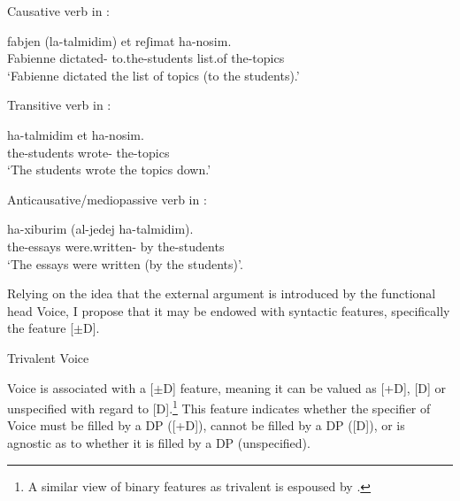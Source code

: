 \begin{exe}
\begin{xlist}
\begin{exe}
\begin{exe}
\begin{exe}
\begin{exe}
\begin{xlist}
\begin{exe}
\begin{xlist}
\begin{xlist}
\begin{xlist}
\begin{exe}
\begin{xlist}
\begin{exe}
\begin{exe}
\begin{xlist}
\begin{exe}
\begin{xlist}
\begin{exe}
\begin{exe}
\begin{xlist}
\begin{exe}
\begin{xlist}
\begin{exe}
\begin{xlist}
\begin{exe}
\begin{exe}
\begin{xlist}
\begin{exe}
\begin{exe}
\begin{xlist}
\begin{exe}
\begin{xlist}
\begin{exe}
\begin{xlist}
\begin{xlist}
\begin{exe}
\begin{exe}
\begin{xlist}
\begin{exe}
\begin{xlist}
 \begin{exe}
 \ex \label{ex:general} 
 \begin{xlist} 
 	\ex  Causative verb in {\thif}: 
		
 		\gll  fabjen  (la-talmidim) et reʃimat ha-nosim.\\
 		  Fabienne dictated- to.the-students  list.of the-topics\\
 		\glt `Fabienne dictated the list of topics (to the students).' 
		
 	\ex  Transitive verb in {\tkal}: 
		
 		\gll  ha-talmidim  et ha-nosim.\\
 		  the-students wrote-  the-topics\\
 		\glt `The students wrote the topics down.' 
	
 	\ex  Anticausative/mediopassive verb in {\tnif}: 
		
 		\gll  ha-xiburim  (al-jedej ha-talmidim).\\
 		  the-essays were.written- by the-students\\
 		\glt `The essays were written (by the students)'. 
	
 \z
\z 

Relying on the idea that the external argument is introduced by the functional head Voice, I propose that it may be endowed with syntactic features, specifically the feature [$\pm$D].
 \begin{exe}
 \ex  Trivalent Voice 
 \begin{xlist} 
 	\ex  Voice is associated with a [$\pm$D] feature, meaning it can be valued as [+D], [\textminus{}D] or unspecified with regard to [D].\footnote{A similar view of binary features as trivalent is espoused by \cite{harbour11}.} 
 	\ex  This feature indicates whether the specifier of Voice must be filled by a DP ([+D]), cannot be filled by a DP ([\textminus{}D]), or is agnostic as to whether it is filled by a DP (unspecified). 
 \z
\z 


\end{xlist}
\end{exe}
\end{xlist}
\end{exe}
\end{xlist}
\end{exe}
\end{xlist}
\end{exe}
\end{exe}
\end{xlist}
\end{xlist}
\end{exe}
\end{xlist}
\end{exe}
\end{xlist}
\end{exe}
\end{exe}
\end{xlist}
\end{exe}
\end{exe}
\end{xlist}
\end{exe}
\end{xlist}
\end{exe}
\end{xlist}
\end{exe}
\end{exe}
\end{xlist}
\end{exe}
\end{xlist}
\end{exe}
\end{exe}
\end{xlist}
\end{exe}
\end{xlist}
\end{xlist}
\end{xlist}
\end{exe}
\end{xlist}
\end{exe}
\end{exe}
\end{exe}
\end{exe}
\end{xlist}
\end{exe}

